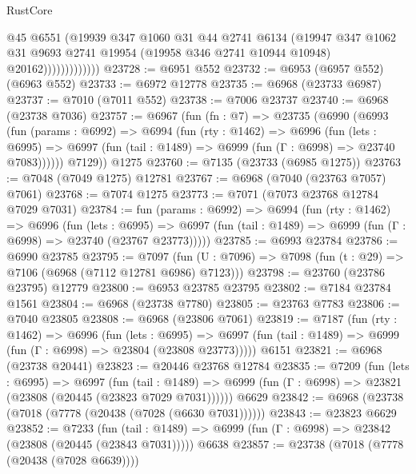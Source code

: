 \begin{lexlean}{RustCore}
\begin{coremodule}
                          @45
                          @6551
                          (@19939
                            @347
                            @1060
                            @31
                            @44
                            @2741
                            @6134
                            (@19947
                              @347
                              @1062
                              @31
                              @9693
                              @2741
                              @19954
                              (@19958 @346 @2741 @10944 @10948)
                              @20162)))))))))))))
@23728 := @6951 @552
@23732 := @6953 (@6957 @552) (@6963 @552)
@23733 := @6972 @12778
@23735 := @6968 (@23733 @6987)
@23737 := @7010 (@7011 @552)
@23738 := @7006 @23737
@23740 := @6968 (@23738 @7036)
@23757 := @6967
    (fun (fn : @7) =>
    @23735
      (@6990
        (@6993
          (fun (params : @6992) =>
          @6994
            (fun (rty : @1462) =>
            @6996
              (fun (lets : @6995) =>
              @6997 (fun (tail : @1489) => @6999 (fun (Γ : @6998) => @23740 @7083))))))
        @7129))
    @1275
@23760 := @7135 (@23733 (@6985 @1275))
@23763 := @7048 (@7049 @1275) @12781
@23767 := @6968 (@7040 (@23763 @7057) @7061)
@23768 := @7074 @1275
@23773 := @7071 (@7073 @23768 @12784 @7029 @7031)
@23784 := fun (params : @6992) =>
  @6994
    (fun (rty : @1462) =>
    @6996
      (fun (lets : @6995) =>
      @6997 (fun (tail : @1489) => @6999 (fun (Γ : @6998) => @23740 (@23767 @23773)))))
@23785 := @6993 @23784
@23786 := @6990 @23785
@23795 := @7097
    (fun (U : @7096) => @7098 (fun (t : @29) => @7106 (@6968 (@7112 @12781 @6986) @7123)))
@23798 := @23760 (@23786 @23795) @12779
@23800 := @6953 @23785 @23795
@23802 := @7184 @23784 @1561
@23804 := @6968 (@23738 @7780)
@23805 := @23763 @7783
@23806 := @7040 @23805
@23808 := @6968 (@23806 @7061)
@23819 := @7187
    (fun (rty : @1462) =>
    @6996
      (fun (lets : @6995) =>
      @6997 (fun (tail : @1489) => @6999 (fun (Γ : @6998) => @23804 (@23808 @23773)))))
    @6151
@23821 := @6968 (@23738 @20441)
@23823 := @20446 @23768 @12784
@23835 := @7209
    (fun (lets : @6995) =>
    @6997
      (fun (tail : @1489) =>
      @6999 (fun (Γ : @6998) => @23821 (@23808 (@20445 (@23823 @7029 @7031))))))
    @6629
@23842 := @6968 (@23738 (@7018 (@7778 (@20438 (@7028 (@6630 @7031))))))
@23843 := @23823 @6629
@23852 := @7233
    (fun (tail : @1489) => @6999 (fun (Γ : @6998) => @23842 (@23808 (@20445 (@23843 @7031)))))
    @6638
@23857 := @23738 (@7018 (@7778 (@20438 (@7028 @6639))))

\end{coremodule}
\end{lexlean}
